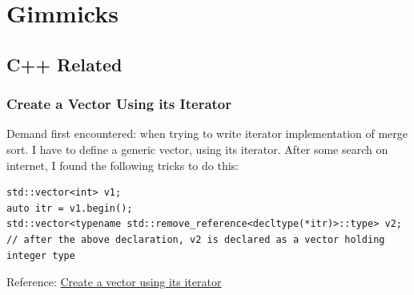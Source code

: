 \documentclass[12pt]{book}
\begin{document}
\part{Gimmicks}
\label{sec:org54ed305}
\chapter{C++ Related}
\label{sec:org3eda537}
\section{Create a Vector Using its Iterator}
\label{sec:org7a6aa06}
Demand first encountered: when trying to write iterator implementation of merge sort. I have to define a generic vector, using its iterator. After some search on internet, I found the following tricks to do this:
\begin{verbatim}
std::vector<int> v1;
auto itr = v1.begin();
std::vector<typename std::remove_reference<decltype(*itr)>::type> v2;
// after the above declaration, v2 is declared as a vector holding integer type
\end{verbatim}

Reference:
\href{https://stackoverflow.com/questions/45217180/initializing-a-vector-of-auto-unknown-type-inside-a-template-function-in-c}{Create a vector using its iterator}
\end{document}
